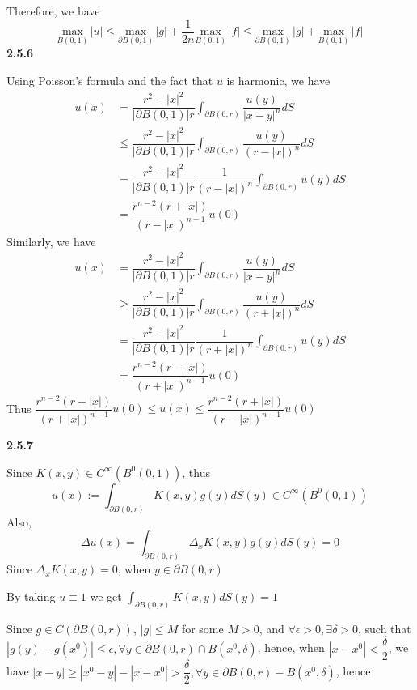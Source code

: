 \documentclass[12pt]{article}
\begin{document}
Therefore, we have $$\underset{B(0,1)}{\mathrm{max}}\,|u|\leq\underset{\partial B(0,1)}{\mathrm{max}}\,|g|+\dfrac{1}{2n}\underset{B(0,1)}{\mathrm{max}}\,|f|\leq\underset{\partial B(0,1)}{\mathrm{max}}\,|g|+\underset{B(0,1)}{\mathrm{max}}\,|f|$$ 
\textbf{2.5.6} \par
Using Poisson's formula and the fact that $u$ is harmonic, we have \[
\begin{aligned}
u(x)
&=\dfrac{r^{2}-|x|^{2}}{|\partial B(0,1)| r}\int_{\partial B(0,r)}\dfrac{u(y)}{|x-y|^{n}}dS \\
&\leq \dfrac{r^{2}-|x|^{2}}{|\partial B(0,1)| r}\int_{\partial B(0,r)}\dfrac{u(y)}{(r-|x|)^{n}}dS \\
&= \dfrac{r^{2}-|x|^{2}}{|\partial B(0,1)| r}\dfrac{1}{(r-|x|)^{n}}\int_{\partial B(0,r)}u(y)dS \\
&= \dfrac{r^{n-2}(r+|x|)}{(r-|x|)^{n-1}}u(0)
\end{aligned}
\]Similarly, we have\[
\begin{aligned}
u(x)
&=\dfrac{r^{2}-|x|^{2}}{|\partial B(0,1)| r}\int_{\partial B(0,r)}\dfrac{u(y)}{|x-y|^{n}}dS \\
&\geq \dfrac{r^{2}-|x|^{2}}{|\partial B(0,1)| r}\int_{\partial B(0,r)}\dfrac{u(y)}{(r+|x|)^{n}}dS \\
&= \dfrac{r^{2}-|x|^{2}}{|\partial B(0,1)| r}\dfrac{1}{(r+|x|)^{n}}\int_{\partial B(0,r)}u(y)dS \\
&= \dfrac{r^{n-2}(r-|x|)}{(r+|x|)^{n-1}}u(0)
\end{aligned}
\]Thus $\dfrac{r^{n-2}(r-|x|)}{(r+|x|)^{n-1}}u(0) \leq u(x) \leq \dfrac{r^{n-2}(r+|x|)}{(r-|x|)^{n-1}}u(0)$ \par
\textbf{2.5.7} \par
Since $K(x,y)\in C^{\infty}(B^{0}(0,1))$, thus $$u(x):=\int_{\partial B(0,r)}K(x,y)g(y)dS(y)\in C^{\infty}(B^{0}(0,1)) $$
Also, $$\Delta u(x) = \int_{\partial B(0,r)}\Delta_{x}K(x,y)g(y)dS(y) = 0 $$Since $\Delta_{x}K(x,y)=0$, when $y\in \partial B(0,r)$ \par
By taking $u\equiv 1$ we get $\displaystyle{\int_{\partial B(0,r)}K(x,y)dS(y)=1}$ \par
Since $g\in C(\partial B(0,r))$, $|g|\leq M$ for some $M>0$, and $\forall \epsilon > 0, \exists \delta > 0$, such that $\left|g(y)-g(x^{0})\right|\leq\epsilon, \forall y\in \partial B(0,r)\cap B(x^{0},\delta)$, hence, when $|x-x^{0}|<\dfrac{\delta}{2}$, we have $|x-y|\geq|x^{0}-y|-|x-x^{0}|>\dfrac{\delta}{2}, \forall y\in\partial B(0,r)- B(x^{0},\delta) $, hence
\end{document}
